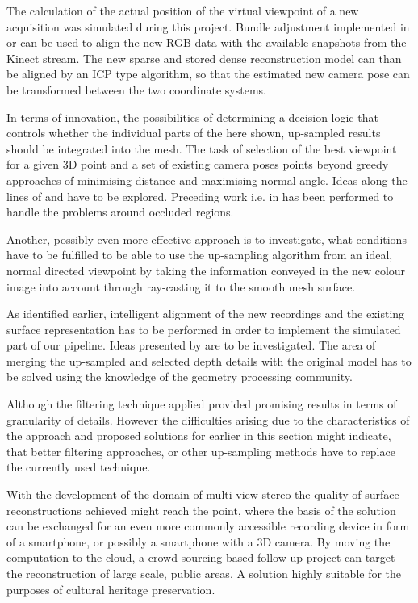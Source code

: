 \documentclass{ucl_thesis}
\begin{document}
\par The calculation of the actual position of the virtual viewpoint of a new acquisition was simulated during this project. Bundle adjustment implemented in \citep{SnavelySS06} or \citep{vsfm} can be used to align the new RGB data with the available snapshots from the Kinect stream. The new sparse and stored dense reconstruction model can than be aligned by an ICP type algorithm, so that the estimated new camera pose can be transformed between the two coordinate systems.

\par In terms of innovation, the possibilities of determining a decision logic that controls whether the individual parts of the here shown, up-sampled results should be integrated into the mesh. The task of selection of the best viewpoint for a given 3D point and a set of existing camera poses points beyond greedy approaches of minimising distance and maximising normal angle. Ideas along the lines of \citep{Buehler:2001} and \citep{keller13realtime} have to be explored. Preceding work i.e. in \citep{Hoiem:2011} has been performed to handle the problems around occluded regions.
\par Another, possibly even more effective approach is to investigate, what conditions have to be fulfilled to be able to use the up-sampling algorithm from an ideal, normal directed viewpoint by taking the information conveyed in the new colour image into account through ray-casting it to the smooth mesh surface.

\par As identified earlier, intelligent alignment of the new recordings and the existing surface representation has to be performed in order to implement the simulated part of our pipeline. Ideas presented by \citep{Herrera:LearnedJointMRF} are to be investigated. The area of merging the up-sampled and selected depth details with the original model has to be solved using the knowledge of the geometry processing community.

\par Although the filtering technique applied provided promising results in terms of granularity of details. However the difficulties arising due to the characteristics of the approach and proposed solutions for earlier in this section might indicate, that better filtering approaches, or other up-sampling methods have to replace the currently used technique. \\

\par With the development of the domain of multi-view stereo the quality of surface reconstructions achieved might reach the point, where the basis of the solution can be exchanged for an even more commonly accessible recording device in form of a smartphone, or possibly a smartphone with a 3D camera. By moving the computation to the cloud, a  crowd sourcing based follow-up project can target the reconstruction of large scale, public areas. A solution highly suitable for the purposes of cultural heritage preservation.


 
%

	
\end{document}
